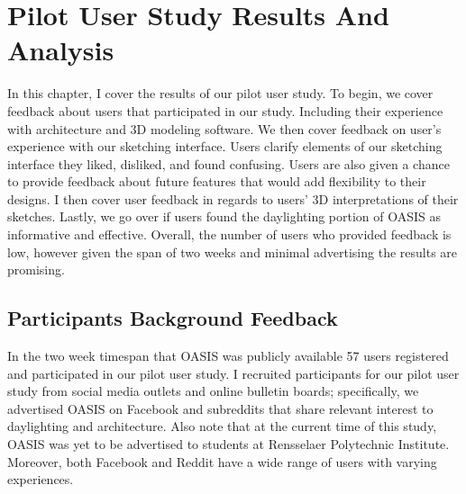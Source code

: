 \chapter{Pilot User Study Results And Analysis} \label{sec:results}
In this chapter,  I cover the results of our pilot user study.
To begin, we cover feedback  about users that participated in our study.
Including their experience with architecture and 3D modeling software.
We then cover feedback on user's experience with our sketching interface.
Users clarify elements of  our sketching interface they liked, disliked, and found confusing.  
Users are also given a chance to provide feedback about future features that would add flexibility to their designs.
I then cover user feedback in regards to users' 3D interpretations of their sketches.
Lastly, we go over if users found the daylighting portion of OASIS as informative and effective.
Overall, the number of users who provided feedback is low, however given the span of two weeks and minimal advertising the results are promising.



\section{Participants Background Feedback}

In the two week timespan that OASIS was publicly available 57 users registered and participated in our pilot user study.
I recruited participants for our pilot user study from social media outlets and online bulletin boards; specifically, we advertised OASIS on Facebook\cite{todo} and subreddits\cite{todo} that share relevant interest to daylighting and architecture. Also note that at the  current time of this study, OASIS was yet to be advertised to students at Rensselaer Polytechnic Institute. Moreover, both Facebook and Reddit have a wide range of users with varying experiences.

